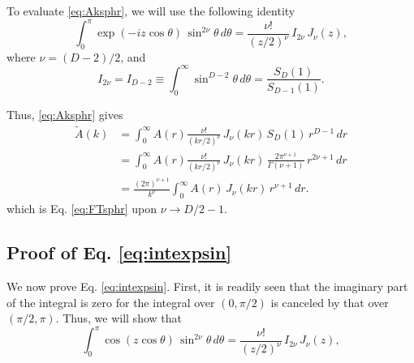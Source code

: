 \documentclass[preprint]{revtex4-1}
\numberwithin{equation}{subsection}
\numberwithin{table}{section}
\begin{document}
To evaluate \eqref{eq:Aksphr},
we will use the following identity
\begin{equation}
  \int_0^\pi
  \exp(-iz\cos\theta) \,
  \sin^{2\nu} \theta \,
  d \theta
=
  \frac{ \nu! }{ (z/2)^\nu } \,
  I_{2 \nu} \, J_\nu(z),
  \label{eq:intexpsin}
\end{equation}
%
where $\nu = (D - 2)/2$,
and
\begin{equation}
  I_{2\nu}
=
  I_{D-2}
\equiv
  \int_0^\infty \sin^{D-2} \theta \, d\theta
=
\frac{ S_{D}(1) }
  { S_{D-1}(1) }.
\end{equation}

Thus, \eqref{eq:Aksphr} gives
\begin{align*}
  \tilde A(k)
&=
\int_0^\infty
A(r)
\frac{ \nu! } { (kr/2)^{\nu} } \, J_\nu(kr) \,
S_D(1) \, r^{D-1} \, dr
\\
&=
\int_0^\infty
A(r)
\frac{ \nu! } { (kr/2)^{\nu} } \, J_\nu(kr) \,
\frac{ 2 \pi^{\nu+1} }{ \Gamma(\nu+1) }
\, r^{2\nu+1} \, dr
\\
&=
\frac{(2\pi)^{\nu+1}}{k^{\nu}}
\int_0^\infty
A(r) \, J_\nu(kr) \,
r^{\nu+1} \, dr.
\end{align*}
which is Eq. \eqref{eq:FTsphr} upon $\nu \rightarrow D/2-1$.



\subsection{Proof of Eq. \eqref{eq:intexpsin} }



We now prove Eq. \eqref{eq:intexpsin}.
%
First, it is readily seen that
the imaginary part of the integral is zero
for the integral over $(0, \pi/2)$
is canceled by that over $(\pi/2, \pi)$.
%
Thus, we will show that
\begin{equation}
  \int_0^\pi
  \cos(z\cos\theta) \,
  \sin^{2\nu} \theta \,
  d \theta
=
  \frac{ \nu! }{ (z/2)^\nu } \,
  I_{2 \nu} \, J_\nu(z),
  \label{eq:intccossin}
\end{equation}
\end{document}
